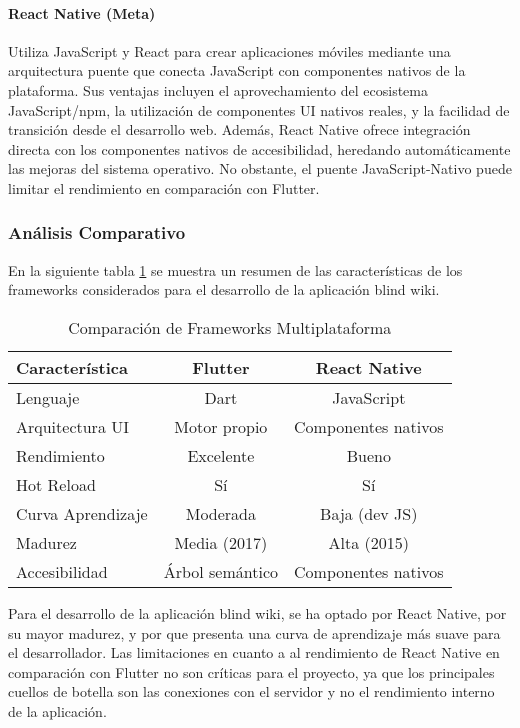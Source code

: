 \paragraph{React Native (Meta)}
Utiliza JavaScript y React para crear aplicaciones móviles mediante una arquitectura puente que conecta JavaScript con componentes nativos de la plataforma. Sus ventajas incluyen el aprovechamiento del ecosistema JavaScript/npm, la utilización de componentes UI nativos reales, y la facilidad de transición desde el desarrollo web. Además, React Native ofrece integración directa con los componentes nativos de accesibilidad, heredando automáticamente las mejoras del sistema operativo. No obstante, el puente JavaScript-Nativo puede limitar el rendimiento en comparación con Flutter.


\subsubsection{Análisis Comparativo}
En la siguiente tabla \ref{tab:framework-comparison} se muestra un resumen de las características de los frameworks considerados para el desarrollo de la aplicación blind wiki.
\begin{table}[h]
    \centering
    \caption{Comparación de Frameworks Multiplataforma}
    \label{tab:framework-comparison}
    \begin{tabular}{|l|c|c|}
        \hline
        \textbf{Característica} & \textbf{Flutter} & \textbf{React Native} \\
        \hline
        Lenguaje & Dart & JavaScript \\
        \hline
        Arquitectura UI & Motor propio & Componentes nativos \\
        \hline
        Rendimiento & Excelente & Bueno \\
        \hline
        Hot Reload & Sí & Sí \\
        \hline
        Curva Aprendizaje & Moderada & Baja (dev JS) \\
        \hline
        Madurez & Media (2017) & Alta (2015) \\
        \hline
        Accesibilidad & Árbol semántico & Componentes nativos \\
        \hline
    \end{tabular}
\end{table}

Para el desarrollo de la aplicación blind wiki, se ha optado por React Native, por su mayor madurez, y por que presenta una curva de aprendizaje más suave para el desarrollador. Las limitaciones en cuanto a al rendimiento de React Native en comparación con Flutter no son críticas para el proyecto, ya que los principales cuellos de botella son las conexiones con el servidor y no el rendimiento interno de la aplicación.

